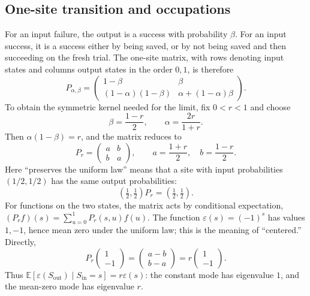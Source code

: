 \documentclass[11pt,reqno]{amsart}
\theoremstyle{definition}
\theoremstyle{remark}
\begin{document}
\subsection{One-site transition and occupations}
For an input failure, the output is a success with probability
$\beta$. For an input success, it is a success either by being saved,
or by not being saved and then succeeding on the fresh trial.
The one-site matrix, with rows denoting input states and columns output
states in the order $0,1$, is therefore
\[
P_{\alpha,\beta}=
\begin{pmatrix}
1-\beta&\beta\\
(1-\alpha)(1-\beta)&\alpha+(1-\alpha)\beta
\end{pmatrix}.
\]
To obtain the symmetric kernel needed for the limit, fix $0<r<1$ and
choose
\[
\beta=\frac{1-r}{2},\qquad \alpha=\frac{2r}{1+r}.
\]
Then $\alpha(1-\beta)=r$, and the matrix reduces to
\begin{equation}\label{eq:P}
P_r=\begin{pmatrix}a&b\\b&a\end{pmatrix},\qquad
a=\frac{1+r}{2},\quad b=\frac{1-r}{2}.
\end{equation}
Here ``preserves the uniform law'' means that a site with input
probabilities $(1/2,1/2)$ has the same output probabilities:
\[
(\tfrac12,\tfrac12)P_r=(\tfrac12,\tfrac12).
\]
For functions on the two states, the matrix acts by conditional
expectation, $(P_rf)(s)=\sum_{u=0}^1P_r(s,u)f(u)$.
The function $\varepsilon(s)=(-1)^s$ has values $1,-1$, hence mean zero
under the uniform law; this is the meaning of ``centered.'' Directly,
\[
P_r\begin{pmatrix}1\\-1\end{pmatrix}
=\begin{pmatrix}a-b\\b-a\end{pmatrix}
=r\begin{pmatrix}1\\-1\end{pmatrix}.
\]
Thus $\mathbb E[\varepsilon(S_{\mathrm{out}})\mid S_{\mathrm{in}}=s]
=r\varepsilon(s)$: the constant mode has eigenvalue $1$, and the
mean-zero mode has eigenvalue $r$.
\end{document}
